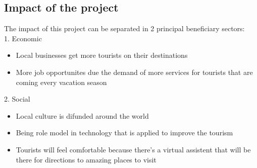 \subsection{Impact of the project}
The impact of this project can be separated in 2 principal beneficiary sectors:\\

1. Economic
  \begin{itemize}
    \item Local businesses get more tourists on their destinations
    \item More job opportunites due the demand of more services for tourists that are coming every vacation season
  \end{itemize}

2. Social 
\begin{itemize}
    \item Local culture is difunded around the world 
    \item Being role model in technology that is applied to improve the tourism
    \item Tourists will feel comfortable because there's a virtual assistent that will be there for directions to 
          amazing places to visit
\end{itemize}

